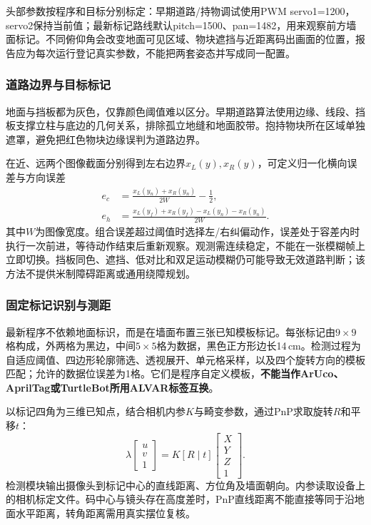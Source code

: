 头部参数按程序和目标分别标定：早期道路/持物调试使用PWM servo1=1200，servo2保持当前值；最新标记路线默认pitch=1500、pan=1482，用来观察前方墙面标记。不同俯仰角会改变地面可见区域、物块遮挡与近距离码出画面的位置，报告应为每次运行登记真实参数，不能把两套姿态并写成同一配置。
\subsubsection{道路边界与目标标记}
地面与挡板都为灰色，仅靠颜色阈值难以区分。早期道路算法使用边缘、线段、挡板支撑立柱与底边的几何关系，排除孤立地缝和地面胶带。抱持物块所在区域单独遮罩，避免把红色物块边缘误判为道路边界。

在近、远两个图像截面分别得到左右边界$x_L(y),x_R(y)$，可定义归一化横向误差与方向误差
\begin{align}
e_c&=\frac{x_L(y_n)+x_R(y_n)}{2W}-\frac12,\\
e_h&=\frac{x_L(y_f)+x_R(y_f)-x_L(y_n)-x_R(y_n)}{2W}.
\end{align}
其中$W$为图像宽度。组合误差超过阈值时选择左/右纠偏动作，误差处于容差内时执行一次前进，等待动作结束后重新观察。观测需连续稳定，不能在一张模糊帧上立即切换。挡板同色、遮挡、低对比和双足运动模糊仍可能导致无效道路判断；该方法不提供米制障碍距离或通用绕障规划。
\subsubsection{固定标记识别与测距}
最新程序不依赖地面标识，而是在墙面布置三张已知模板标记。每张标记由$9\times9$格构成，外两格为黑边，中间$5\times5$格为数据，黑色正方形边长14\,cm。检测过程为自适应阈值、四边形轮廓筛选、透视展开、单元格采样，以及四个旋转方向的模板匹配；允许的数据位误差为1格。它们是程序自定义模板，\textbf{不能当作ArUco、AprilTag或TurtleBot所用ALVAR标签互换}。

以标记四角为三维已知点，结合相机内参$K$与畸变参数，通过PnP求取旋转$R$和平移$t$：
\begin{equation}
\lambda\begin{bmatrix}u\\v\\1\end{bmatrix}
=K\left[R\mid t\right]\begin{bmatrix}X\\Y\\Z\\1\end{bmatrix}.
\end{equation}
检测模块输出摄像头到标记中心的直线距离、方位角及墙面朝向。内参读取设备上的相机标定文件。码中心与镜头存在高度差时，PnP直线距离不能直接等同于沿地面水平距离，转角距离需用真实摆位复核。

